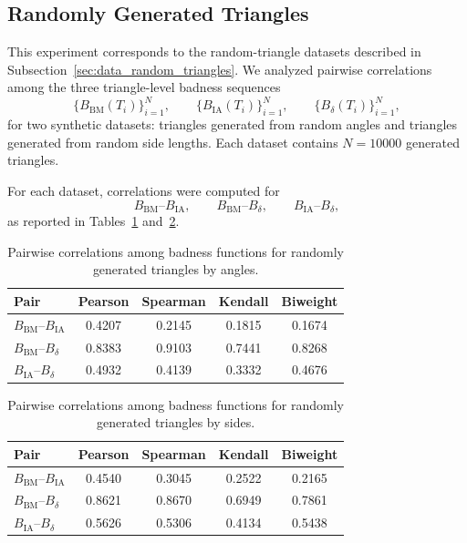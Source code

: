 \documentclass[11pt]{article}
\begin{document}
\subsection{Randomly Generated Triangles}
\label{sec:random_triangle_correlation}

This experiment corresponds to the random-triangle datasets described in Subsection~\ref{sec:data_random_triangles}. We analyzed pairwise correlations among the three triangle-level badness sequences
\[
\{B_{\mathrm{BM}}(T_i)\}_{i=1}^{N},\qquad
\{B_{\mathrm{IA}}(T_i)\}_{i=1}^{N},\qquad
\{B_{\delta}(T_i)\}_{i=1}^{N},
\]
for two synthetic datasets: triangles generated from random angles and triangles generated from random side lengths. Each dataset contains \(N=10000\) generated triangles.

For each dataset, correlations were computed for
\[
B_{\mathrm{BM}}\text{--}B_{\mathrm{IA}}, \qquad
B_{\mathrm{BM}}\text{--}B_{\delta}, \qquad
B_{\mathrm{IA}}\text{--}B_{\delta},
\]
as reported in Tables~\ref{tab:random_triangles_angles_corr} and~\ref{tab:random_triangles_sides_corr}.

\begin{table}[h!]
\centering
\caption{Pairwise correlations among badness functions for randomly generated triangles by angles.}
\label{tab:random_triangles_angles_corr}
\small
\setlength{\tabcolsep}{7pt}
\begin{tabular}{lcccc}
\hline
Pair & Pearson & Spearman & Kendall & Biweight \\
\hline
\(B_{\mathrm{BM}}\)--\(B_{\mathrm{IA}}\)     & 0.4207 & 0.2145 & 0.1815 & 0.1674 \\
\(B_{\mathrm{BM}}\)--\(B_{\delta}\)          & 0.8383 & 0.9103 & 0.7441 & 0.8268 \\
\(B_{\mathrm{IA}}\)--\(B_{\delta}\)          & 0.4932 & 0.4139 & 0.3332 & 0.4676 \\
\hline
\end{tabular}
\end{table}

\begin{table}[h!]
\centering
\caption{Pairwise correlations among badness functions for randomly generated triangles by sides.}
\label{tab:random_triangles_sides_corr}
\small
\setlength{\tabcolsep}{7pt}
\begin{tabular}{lcccc}
\hline
Pair & Pearson & Spearman & Kendall & Biweight \\
\hline
\(B_{\mathrm{BM}}\)--\(B_{\mathrm{IA}}\)     & 0.4540 & 0.3045 & 0.2522 & 0.2165 \\
\(B_{\mathrm{BM}}\)--\(B_{\delta}\)          & 0.8621 & 0.8670 & 0.6949 & 0.7861 \\
\(B_{\mathrm{IA}}\)--\(B_{\delta}\)          & 0.5626 & 0.5306 & 0.4134 & 0.5438 \\
\hline
\end{tabular}
\end{table}
\end{document}
